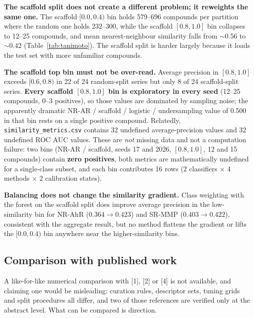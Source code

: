 \documentclass[10pt,letterpaper]{article}
\begin{document}
\textbf{The scaffold split does not create a different problem; it reweights the same one.} The
scaffold $[0.0,0.4)$ bin holds 579--696 compounds per partition where the random one holds 232--300,
while the scaffold $[0.8,1.0]$ bin collapses to 12--25 compounds, and mean nearest-neighbour
similarity falls from ${\sim}0.56$ to ${\sim}0.42$ (Table~\ref{tab:tanimoto}). The scaffold split is
harder largely because it loads the test set with more unfamiliar compounds.

\textbf{The scaffold top bin must not be over-read.} Average precision in $[0.8,1.0]$ exceeds
$[0.6,0.8)$ in 22 of 24 random-split series but only 8 of 24 scaffold-split series. \textbf{Every
scaffold $[0.8,1.0]$ bin is exploratory in every seed} (12--25 compounds, 0--3 positives), so those
values are dominated by sampling noise; the apparently dramatic NR-AR / scaffold / logistic /
undersampling value of 0.500 in that bin rests on a single positive compound. Relatedly,
\texttt{similarity\_metrics.csv} contains 32 undefined average-precision values and 32 undefined ROC
AUC values. These are \emph{not} missing data and not a computation failure: two bins (NR-AR /
scaffold, seeds 17 and 2026, $[0.8,1.0]$, 12 and 15 compounds) contain \textbf{zero positives}, both
metrics are mathematically undefined for a single-class subset, and each bin contributes 16 rows
(2 classifiers $\times$ 4 methods $\times$ 2 calibration states).

\textbf{Balancing does not change the similarity gradient.} Class weighting with the forest on the
scaffold split does improve average precision in the low-similarity bin for NR-AhR
($0.364 \to 0.423$) and SR-MMP ($0.403 \to 0.422$), consistent with the aggregate result, but no
method flattens the gradient or lifts the $[0.0,0.4)$ bin anywhere near the higher-similarity bins.

\subsection{Comparison with published work}

A like-for-like numerical comparison with [1], [2] or [4] is not available, and claiming one would be
misleading: curation rules, descriptor sets, tuning grids and split procedures all differ, and two of
those references are verified only at the abstract level. What can be compared is direction.
\end{document}
